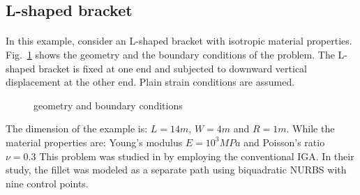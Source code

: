 \subsection{L-shaped bracket}
\label{subsection:l_shaped_bracket}
\paragraph{}
In this example, consider an L-shaped bracket with isotropic material properties.
Fig.~\ref{fig:l_with_fillet_geo_bc} shows the geometry and the boundary conditions of the problem.
The L-shaped bracket is fixed at one end and subjected to downward vertical displacement at the other end.
Plain strain conditions are assumed.
    \begin{figure}[h!]
        \centering
        \caption{geometry and boundary conditions} 
        \label{fig:l_with_fillet_geo_bc}         
    \end{figure}

The dimension of the example is: $L=14m$, $W=4m$ and $R=1m$.
While the material properties are: Young's modulus $E=10^3MPa$ and Poisson's ratio $\nu=0.3$
This problem was studied in \cite{LIPTON2010357} by employing the conventional IGA.
In their study, the fillet was modeled as a separate path using biquadratic NURBS with nine control points.

